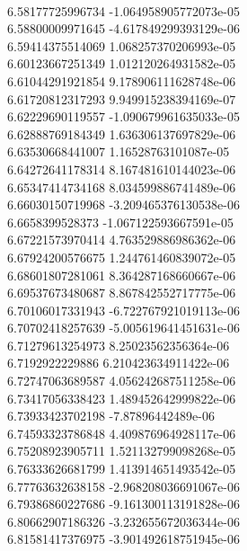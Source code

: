 { \\
6.58177725996734 -1.064958905772073e-05
 \\
6.58800009971645 -4.617849299393129e-06
 \\
6.59414375514069 1.068257370206993e-05
 \\
6.60123667251349 1.012120264931582e-05
 \\
6.61044291921854 9.178906111628748e-06
 \\
6.61720812317293 9.949915238394169e-07
 \\
6.62229690119557 -1.090679961635033e-05
 \\
6.62888769184349 1.636306137697829e-06
 \\
6.63530668441007 1.16528763101087e-05
 \\
6.64272641178314 8.167481610144023e-06
 \\
6.65347414734168 8.034599886741489e-06
 \\
6.66030150719968 -3.209465376130538e-06
 \\
6.6658399528373 -1.067122593667591e-05
 \\
6.67221573970414 4.763529886986362e-06
 \\
6.67924200576675 1.244761460839072e-05
 \\
6.68601807281061 8.364287168660667e-06
 \\
6.69537673480687 8.867842552717775e-06
 \\
6.70106017331943 -6.722767921019113e-06
 \\
6.70702418257639 -5.005619641451631e-06
 \\
6.71279613254973 8.25023562356364e-06
 \\
6.7192922229886 6.210423634911422e-06
 \\
6.72747063689587 4.056242687511258e-06
 \\
6.73417056338423 1.489452642999822e-06
 \\
6.73933423702198 -7.87896442489e-06
 \\
6.74593323786848 4.409876964928117e-06
 \\
6.75208923905711 1.521132799098268e-05
 \\
6.76333626681799 1.413914651493542e-05
 \\
6.77763632638158 -2.968208036691067e-06
 \\
6.79386860227686 -9.161300113191828e-06
 \\
6.80662907186326 -3.232655672036344e-06
 \\
6.81581417376975 -3.901492618751945e-06
 \\
}
